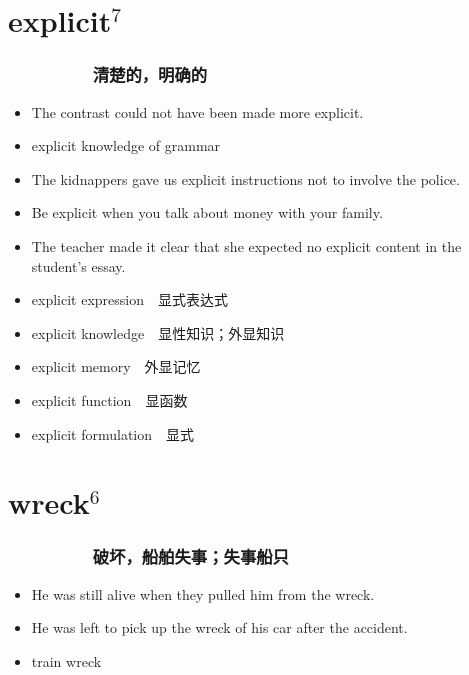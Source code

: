 \documentclass[UTF8,4pt,a3paper,space]{article}
\begin{document}
\begin{multicols}{4}
\section{explicit$^7$}
\subsubsection*{\ \ \ \ \ \ \ \ \ 清楚的，明确的}\begin{itemize}
\itemsep-0.5em
    \item The contrast could not have been made more explicit.    \item explicit knowledge of grammar    \item The kidnappers gave us explicit instructions not to involve the police.    \item Be explicit when you talk about money with your family.    \item The teacher made it clear that she expected no explicit content in the student's essay. 
\end{itemize}
\begin{itemize}
\itemsep-0.5em
   \item explicit expression\ \ 显式表达式
   \item explicit knowledge\ \ 显性知识；外显知识
   \item explicit memory\ \ 外显记忆
   \item explicit function\ \ 显函数
   \item explicit formulation\ \ 显式
\end{itemize}
\hrulefill


\section{wreck$^6$}
\subsubsection*{\ \ \ \ \ \ \ \ \ 破坏，船舶失事；失事船只}\begin{itemize}
\itemsep-0.5em
    \item He was still alive when they pulled him from the wreck.    \item He was left to pick up the wreck of his car after the accident. 
\end{itemize}
\begin{itemize}
\itemsep-0.5em
   \item train wreck\end{itemize}
\hrulefill



\end{multicols}
\end{document}
